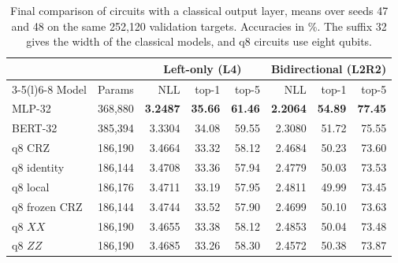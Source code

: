\documentclass[11pt,a4paper]{article}
\begin{document}
  \begin{table}[H]
    \centering\small
    \caption{Final comparison of circuits with a classical output layer, means over seeds 47 and 48 on the same 252,120 validation targets. Accuracies in \%. The suffix 32 gives the width of the classical models, and q8 circuits use eight qubits.}
    \label{tab:robust}
    \begin{tabular}{@{}lrrrrrrr@{}}
      \toprule
                    &         & \multicolumn{3}{c}{Left-only (L4)} & \multicolumn{3}{c}{Bidirectional (L2R2)}                                                                      \\
      \cmidrule(lr){3-5}\cmidrule(l){6-8}
      Model         & Params  & NLL                                & top-1                                    & top-5          & NLL             & top-1          & top-5          \\
      \midrule
      MLP-32        & 368,880 & \textbf{3.2487}                    & \textbf{35.66}                           & \textbf{61.46} & \textbf{2.2064} & \textbf{54.89} & \textbf{77.45} \\
      BERT-32       & 385,394 & 3.3304                             & 34.08                                    & 59.55          & 2.3080          & 51.72          & 75.55          \\
      q8 CRZ        & 186,190 & 3.4664                             & 33.32                                    & 58.12          & 2.4684          & 50.23          & 73.60          \\
      q8 identity   & 186,144 & 3.4708                             & 33.36                                    & 57.94          & 2.4779          & 50.03          & 73.53          \\
      q8 local      & 186,176 & 3.4711                             & 33.19                                    & 57.95          & 2.4811          & 49.99          & 73.45          \\
      q8 frozen CRZ & 186,144 & 3.4744                             & 33.52                                    & 57.90          & 2.4699          & 50.10          & 73.63          \\
      q8 $XX$       & 186,190 & 3.4655                             & 33.38                                    & 58.12          & 2.4853          & 50.04          & 73.48          \\
      q8 $ZZ$       & 186,190 & 3.4685                             & 33.26                                    & 58.30          & 2.4572          & 50.38          & 73.87          \\
      \bottomrule
    \end{tabular}
  \end{table}
\end{document}
